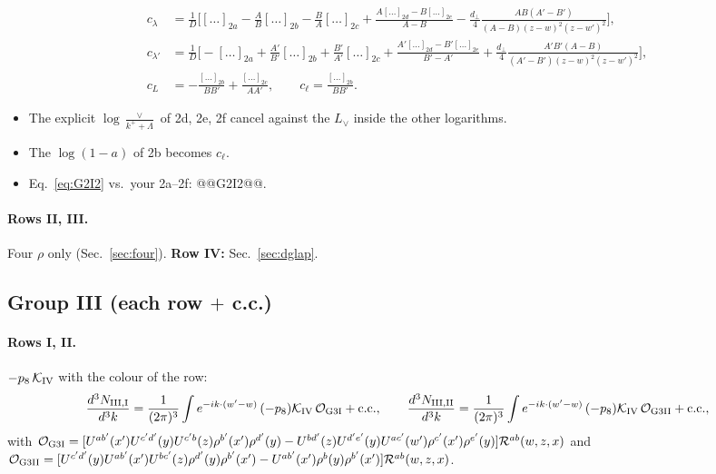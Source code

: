 \documentclass[10pt]{article}
\numberwithin{equation}{section}
\newcommand{\Lv}{L_{\vee}}
\newcommand{\Rc}{\mathcal R}
\newcommand{\OO}{\mathcal O}
\newcommand{\KK}{\mathcal K}
\newcommand{\pre}{\frac{1}{(2\pi)^3}}
\newcommand{\phw}{e^{-ik\cdot(w'-w)}}
\begin{document}
\begin{align*}
c_\lambda&=\frac1D\Big[[\dots]_{2a}-\frac AB[\dots]_{2b}-\frac BA[\dots]_{2c}+\frac{A[\dots]_{2d}-B[\dots]_{2e}}{A-B}-\frac{d_\perp}{4}\frac{AB(A'-B')}{(A-B)(z-w)^2(z-w')^2}\Big],\\
c_{\lambda'}&=\frac1D\Big[-[\dots]_{2a}+\frac{A'}{B'}[\dots]_{2b}+\frac{B'}{A'}[\dots]_{2c}+\frac{A'[\dots]_{2d}-B'[\dots]_{2e}}{B'-A'}+\frac{d_\perp}{4}\frac{A'B'(A-B)}{(A'-B')(z-w)^2(z-w')^2}\Big],\\
c_L&=-\frac{[\dots]_{2b}}{BB'}+\frac{[\dots]_{2c}}{AA'},\qquad c_\ell=\frac{[\dots]_{2b}}{BB'}.
\end{align*}
\begin{itemize}
\item The explicit $\log\frac{\vee}{k^++\Lambda}$ of 2d, 2e, 2f cancel against the $\Lv$ inside the other logarithms.
\item The $\log(1-a)$ of 2b becomes $c_\ell$.
\item Eq.~\eqref{eq:G2I2} vs.\ your 2a--2f: @@G2I2@@.
\end{itemize}
\paragraph{Rows II, III.} Four $\rho$ only (Sec.~\ref{sec:four}). \textbf{Row IV:} Sec.~\ref{sec:dglap}.

\subsection{Group III (each row $+$ c.c.)}
\paragraph{Rows I, II.} $-p_8\,\KK_{\rm IV}$ with the colour of the row:
\begin{equation}
\frac{d^3N_{\rm III,I}}{d^3k}=\pre\int\phw\,(-p_8)\KK_{\rm IV}\,\OO_{\rm G3I}+{\rm c.c.},\qquad\frac{d^3N_{\rm III,II}}{d^3k}=\pre\int\phw\,(-p_8)\KK_{\rm IV}\,\OO_{\rm G3II}+{\rm c.c.},
\label{eq:G3I}
\end{equation}
with $\OO_{\rm G3I}=[U^{ab'}(x')U^{c'd'}(y)U^{c'b}(z)\rho^{b'}(x')\rho^{d'}(y)-U^{bd'}(z)U^{d'e'}(y)U^{ac'}(w')\rho^{c'}(x')\rho^{e'}(y)]\Rc^{ab}(w,z,x)$ and $\OO_{\rm G3II}=[U^{c'd'}(y)U^{ab'}(x')U^{bc'}(z)\rho^{d'}(y)\rho^{b'}(x')-U^{ab'}(x')\rho^b(y)\rho^{b'}(x')]\Rc^{ab}(w,z,x)$.
\end{document}
